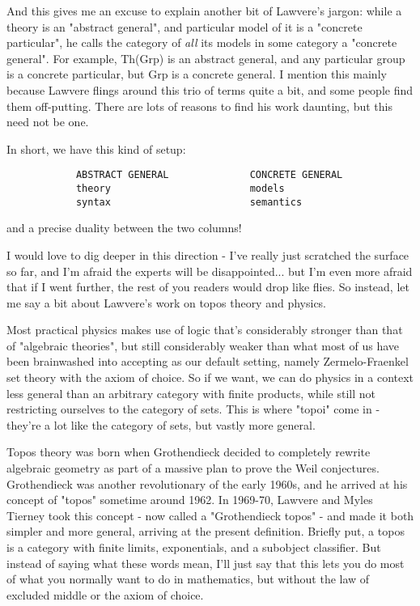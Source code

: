 And this gives me an excuse to explain another bit of Lawvere's
jargon: while a theory is an "abstract general", and
particular model of it is a "concrete particular", he calls
the category of \emph{all} its models in some category a
"concrete general".  For example, Th(Grp) is an abstract
general, and any particular group is a concrete particular, but Grp is
a concrete general.  I mention this mainly because Lawvere flings
around this trio of terms quite a bit, and some people find them
off-putting.  There are lots of reasons to find his work daunting, but
this need not be one.

In short, we have this kind of setup:

\begin{verbatim}
            ABSTRACT GENERAL              CONCRETE GENERAL
            theory                        models
            syntax                        semantics
\end{verbatim}
    
and a precise duality between the two columns!

I would love to dig deeper in this direction - I've really just
scratched the surface so far, and I'm afraid the experts will be
disappointed... but I'm even more afraid that if I went further,
the rest of you readers would drop like flies.  So instead, let me 
say a bit about Lawvere's work on topos theory and physics.  

Most practical physics makes use of logic that's considerably stronger
than that of "algebraic theories", but still considerably
weaker than what most of us have been brainwashed into accepting as
our default setting, namely Zermelo-Fraenkel set theory with the axiom
of choice.  So if we want, we can do physics in a context less general
than an arbitrary category with finite products, while still not
restricting ourselves to the category of sets.  This is where
"topoi" come in - they're a lot like the category of sets,
but vastly more general.

Topos theory was born when Grothendieck decided to completely rewrite
algebraic geometry as part of a massive plan to prove the Weil
conjectures.  Grothendieck was another revolutionary of the early
1960s, and he arrived at his concept of "topos" sometime
around 1962.  In 1969-70, Lawvere and Myles Tierney took this concept -
now called a "Grothendieck topos" - and made it both simpler
and more general, arriving at the present definition.  Briefly put, a
topos is a category with finite limits, exponentials, and a subobject
classifier.  But instead of saying what these words mean, I'll just
say that this lets you do most of what you normally want to do in
mathematics, but without the law of excluded middle or the axiom of
choice.


